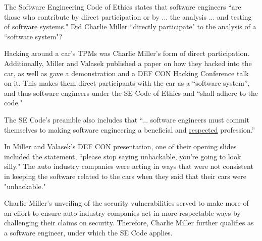 \documentclass[12pt]{article}
\begin{document}
\begin{multicols}{2}
The Software Engineering Code of Ethics states that software engineers ``are those who contribute by direct participation or by ... the analysis ... and testing of software systems."\cite{seCode} Did Charlie Miller ``directly participate" to the analysis of a ``software system"?

Hacking around a car's TPMs was Charlie Miller's form of direct participation. Additionally,  Miller and Valasek published a paper on how they hacked into the car\cite{officialPaper}, as well as gave a demonstration\cite{wired} and a DEF CON Hacking Conference talk on it\cite{youtube}. This makes them direct participants with the car as a ``software system'', and thus software engineers under the SE Code of Ethics and ``shall adhere to the code."\cite{seCode}

The SE Code's preamble also includes that ``... software engineers must commit themselves to making software engineering a beneficial and \underline{respected} profession.''

In Miller and Valasek's DEF CON presentation, one of their opening slides included the statement, ``please stop saying unhackable, you're going to look silly." The auto industry companies were acting in ways that were not consistent in keeping the software related to the cars when they said that their cars were "unhackable."

Charlie Miller's unveiling of the security vulnerabilities served to make more of an effort to ensure auto industry companies act in more respectable ways by challenging their claims on security. Therefore, Charlie Miller further qualifies as a software engineer, under which the SE Code applies.









\end{multicols}
\end{document}
